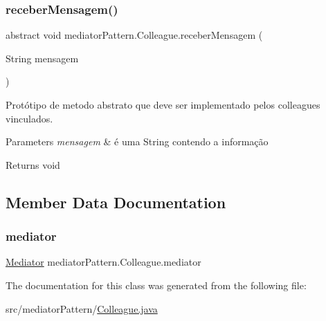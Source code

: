 \subsubsection{\texorpdfstring{receberMensagem()}{receberMensagem()}}
{\footnotesize\ttfamily abstract void mediator\+Pattern.\+Colleague.\+receber\+Mensagem (\begin{DoxyParamCaption}\item[{String}]{mensagem }\end{DoxyParamCaption})\hspace{0.3cm}{\ttfamily [abstract]}}



Protótipo de metodo abstrato que deve ser implementado pelos colleagues vinculados. 


\begin{DoxyParams}{Parameters}
{\em mensagem} & é uma String contendo a informação \\
\hline
\end{DoxyParams}
\begin{DoxyReturn}{Returns}
void 
\end{DoxyReturn}


\subsection{Member Data Documentation}
\mbox{\label{classmediator_pattern_1_1_colleague_a2c5e9bbff6e49aca728d19fb3daf2aa1}} 
\subsubsection{\texorpdfstring{mediator}{mediator}}
{\footnotesize\ttfamily \mbox{\hyperlink{interfacemediator_pattern_1_1_mediator}{Mediator}} mediator\+Pattern.\+Colleague.\+mediator\hspace{0.3cm}{\ttfamily [protected]}}



The documentation for this class was generated from the following file\+:\begin{DoxyCompactItemize}
\item 
src/mediator\+Pattern/\mbox{\hyperlink{_colleague_8java}{Colleague.\+java}}\end{DoxyCompactItemize}
